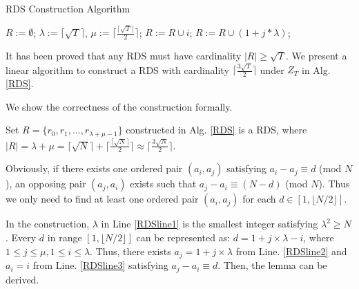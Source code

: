 \begin{algorithm}[!h]
    \caption{RDS Construction Algorithm}
    \label{RDS}
    \begin{algorithmic}[1]
    \STATE $R :=\emptyset$; $\lambda :=\lceil \sqrt{T}  \rceil$,
    $\mu :=\lceil \frac{\lceil \sqrt{T} \rceil}{2} \rceil$;\label{RDSline1}
        \STATE $R :=R \cup i$; \label{RDSline2}
    \ENDFOR
        \STATE $R :=R \cup (1 + j * \lambda )$; \label{RDSline3}
    \ENDFOR
    \end{algorithmic}
\end{algorithm}

It has been proved that any RDS must have cardinality $|R| \geq \sqrt{T}$\cite{luk1997two}.
We present a linear algorithm to construct a RDS with 
cardinality $\lceil \frac{3\sqrt{T}}{2}  \rceil$ under $Z_T$ in Alg. \ref{RDS}.

We show the correctness of the construction formally.
\begin{lemma}
\label{RDS1}
Set $R = \{r_0, r_1, ..., r_{\lambda + \mu - 1}\}$ constructed in Alg. \ref{RDS} is a RDS,
where $|R| = \lambda + \mu = \lceil \sqrt{N}  \rceil + \lceil \frac{\lceil \sqrt{N} \rceil}{2} \rceil
\approx \lceil \frac{3\sqrt{N}}{2}  \rceil$.
\end{lemma}
\begin{IEEEproof}
Obviously, if there exists one ordered pair $(a_i,a_j)$ satisfying  $a_i - a_j \equiv d$ (mod $N$),
an opposing pair $(a_j,a_i)$ exists such that
$a_j - a_i \equiv (N-d)$ (mod $N$). Thus we only need to find
at least one ordered pair $(a_i,a_j)$ for each $d \in [1, \lfloor N/2 \rfloor]$.

In the construction, $\lambda$ in Line \ref{RDSline1} is the smallest integer satisfying
$\lambda^2 \geq N$. Every $d$ in range $[1, \lfloor N/2 \rfloor]$
can be represented as: $ d = 1 + j \times \lambda - i$, where $1 \leq j \leq \mu,
1 \leq i \leq \lambda$. Thus, there exists $a_j = 1 + j \times \lambda$
from Line. \ref{RDSline2} and $a_i = i$ from Line. \ref{RDSline3}
satisfying  $a_j - a_i \equiv d$. Then, the lemma can be derived.
\end{IEEEproof}

